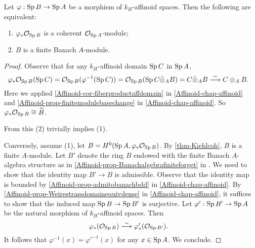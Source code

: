\begin{corollary}\label{cor-finitmodulecohpush}
    Let $\varphi:\operatorname{Sp} B\rightarrow \operatorname{Sp} A$ be a morphism of $k_H$-affinoid spaces. Then the following are equivalent:
    \begin{enumerate}
        \item $\varphi_*\mathcal{O}_{\operatorname{Sp} B}$ is a coherent $\mathcal{O}_{\operatorname{Sp} A}$-module;
        \item $B$ is a finite Banach $A$-module.
    \end{enumerate}
\end{corollary}
\begin{proof}
    Observe that for any $k_H$-affinoid domain $\operatorname{Sp} C$ in $\operatorname{Sp} A$,
    \[
        \varphi_*\mathcal{O}_{\operatorname{Sp} B}(\operatorname{Sp} C)=\mathcal{O}_{\operatorname{Sp} B}(\varphi^{-1}(\operatorname{Sp} C))=\mathcal{O}_{\operatorname{Sp} B}(\operatorname{Sp} C\hat{\otimes}_A B)=C\hat{\otimes}_A B\stackrel{\sim}{\longrightarrow} C\otimes_A B.
    \]
    Here we applied \cref{Affinoid-cor-fiberproductaffdomain} in \cref{Affinoid-chap-affinoid} and \cref{Affinoid-prop-finitemodulebasechange} in \cref{Affinoid-chap-affinoid}. So $\varphi_*\mathcal{O}_{\operatorname{Sp} B}\cong \widetilde{B}$.

    From this (2) trivially implies (1).

    Conversely, assume (1), let $B=H^0(\operatorname{Sp} A,\varphi_*\mathcal{O}_{\operatorname{Sp} B})$. By \cref{thm-Kiehlcoh}, $B$ is a finite $A$-module. Let $B'$ denote the ring $B$ endowed with the finite Banach $A$-algebra structure as in \cref{Affinoid-prop-Banachalgebrafiniteforget} in . We need to show that the identity map $B'\rightarrow B$ is admissible. Observe that the identity map is bounded by \cref{Affinoid-prop-admitobanachbdd} in \cref{Affinoid-chap-affinoid}. By \cref{Affinoid-prop-Weirestrassdomainequivdense} in \cref{Affinoid-chap-affinoid}, it suffices to show that the induced map $\operatorname{Sp} B\rightarrow \operatorname{Sp} B'$ is surjective. Let $\varphi':\operatorname{Sp} B'\rightarrow \operatorname{Sp} A$ be the natural morphism of $k_H$-affinoid spaces. Then 
    \[
        \varphi_*(\mathcal{O}_{\operatorname{Sp} B})\stackrel{\sim}{\longrightarrow} \varphi'_*(\mathcal{O}_{\operatorname{Sp} B'}).
    \]
    It follows that $\varphi^{-1}(x)=\varphi'^{-1}(x)$ for any $x\in \operatorname{Sp} A$. We conclude.
\end{proof}

